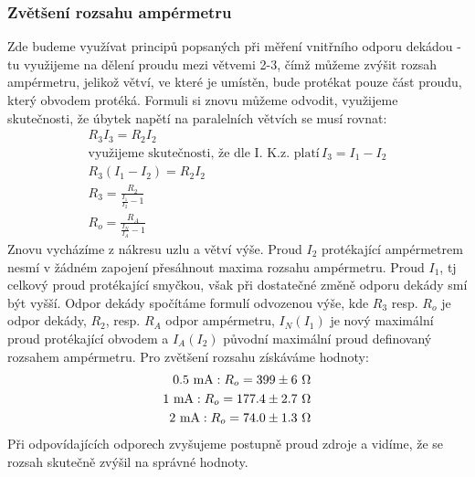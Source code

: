 \documentclass[czech,11pt,a4paper]{article}
\begin{document}
		\subsubsection{Zvětšení rozsahu ampérmetru}
		Zde budeme využívat principů popsaných při měření vnitřního odporu dekádou - tu využijeme na dělení proudu mezi větvemi 2-3, čímž můžeme zvýšit rozsah ampérmetru, jelikož větví, ve které je umístěn, bude protékat pouze část proudu, který obvodem protéká. Formuli si znovu můžeme odvodit, využijeme skutečnosti, že úbytek napětí na paralelních větvích se musí rovnat:
		\begin{gather*}
			R_3 I_3 = R_2 I_2\\
			\text{využijeme skutečnosti, že dle I. K.z. platí}\, I_3 = I_1 - I_2 \\
			R_3 (I_1 - I_2) = R_2 I_2 \\
			R_3 = \frac{R_2}{\frac {I_1} {I_2} -1} \\
			R_o = \frac{R_A}{\frac{I_N}{I_A}-1}
		\end{gather*}
		Znovu vycházíme z nákresu uzlu a větví výše. Proud $I_2$ protékající ampérmetrem nesmí v žádném zapojení přesáhnout maxima rozsahu ampérmetru. Proud $I_1$, tj celkový proud protékající smyčkou, však při dostatečné změně odporu dekády smí být vyšší. Odpor dekády spočítáme formulí odvozenou výše, kde $R_3$ resp. $R_o$ je odpor dekády, $R_2$, resp. $R_A$ odpor ampérmetru, $I_N (I_1)$ je nový maximální proud protékající obvodem a $I_A (I_2)$ původní maximální proud definovaný rozsahem ampérmetru.
		Pro zvětšení rozsahu získáváme hodnoty:
		\begin{align*}
			0.5 \text{ mA}: R_o = 399 \pm 6 \text{ $\Omega$} \\
			1 \text{ mA}: R_o = 177.4 \pm 2.7 \text{ $ \Omega$} \\
			2 \text{ mA}: R_o = 74.0 \pm 1.3 \text{ $ \Omega$} 
		\end{align*}
		Při odpovídajících odporech zvyšujeme postupně proud zdroje a vidíme, že se rozsah skutečně zvýšil na správné hodnoty.
		
\end{document}
